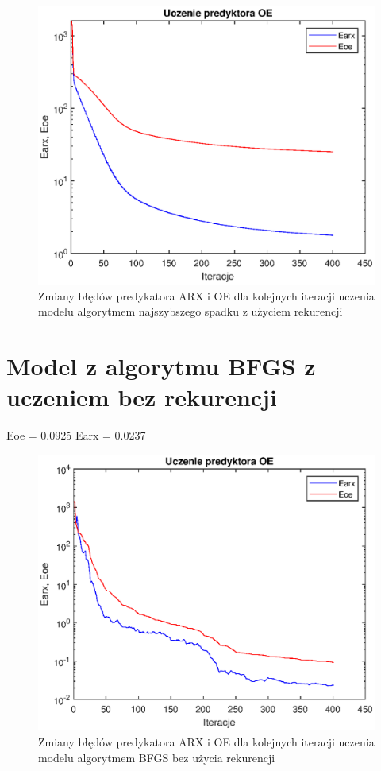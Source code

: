 		\begin{figure}[h!]
			\centering
			\includegraphics[width=\linewidth]{img/NS_OE_p.eps}
			\caption{Zmiany błędów predykatora ARX i OE dla kolejnych iteracji uczenia modelu algorytmem najszybszego spadku z użyciem rekurencji}
			\label{fig:ns_oe_p}
		\end{figure}
		
		\newpage
	\section{Model z algorytmu BFGS z uczeniem bez rekurencji}
		\label{sec:bfgs_arx}
		Eoe = 0.0925
		Earx = 0.0237
		
		\begin{figure}[h!]
			\centering
			\includegraphics[width=\linewidth]{img/BFGS_ARX_p.eps}
			\caption{Zmiany błędów predykatora ARX i OE dla kolejnych iteracji uczenia modelu algorytmem BFGS bez użycia rekurencji}
			\label{fig:bfgs_arx_p}
		\end{figure}
		
